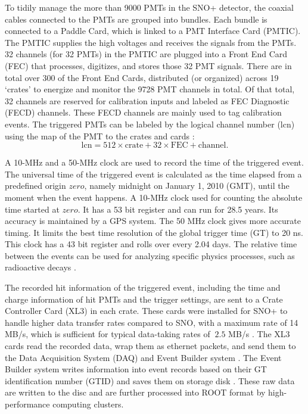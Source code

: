 To tidily manage the more than 9000 PMTs in the SNO+ detector, the coaxial cables connected to the PMTs are grouped into bundles. Each bundle is connected to a Paddle Card, which is linked to a PMT Interface Card (PMTIC). The PMTIC supplies the high voltages and receives the signals from the PMTs. 32 channels (for 32 PMTs) in the PMTIC are plugged into a Front End Card (FEC) that processes, digitizes, and stores those 32 PMT signals. There are in total over 300 of the Front End Cards, distributed (or organized) across 19 `crates' to energize and monitor the 9728 PMT channels in total. Of that total, 32 channels are reserved for calibration inputs and labeled as FEC Diagnostic (FECD) channels. These FECD channels are mainly used to tag calibration events. The triggered PMTs can be labeled by the logical channel number (lcn) using the map of the PMT to the crates and cards \cite{snop_jinst,stringer2019sensitivity}:
\begin{equation}
\mathrm{lcn = 512 \times crate + 32 \times FEC + channel}.
\end{equation}

A 10-MHz and a 50-MHz clock are used to record the time of the triggered event. The universal time of the triggered event is calculated as the time elapsed from a predefined origin $zero$, namely midnight on January 1, 2010 (GMT), until the moment when the event happens. A 10-MHz clock used for counting the absolute time started at $zero$. It has a 53 bit register and can run for 28.5 years. Its accuracy is maintained by a GPS system. The 50 MHz clock gives more accurate timing. It limits the best time resolution of the global trigger time (GT) to 20 ns. This clock has a 43 bit register and rolls over every 2.04 days. The relative time between the events can be used for analyzing specific physics processes, such as radioactive decays \cite{rattime,stringer2019sensitivity}. 

The recorded hit information of the triggered event, including the time and charge information of hit PMTs and the trigger settings, are sent to a Crate Controller Card (XL3) in each crate. These cards were installed for SNO+ to handle higher data transfer rates compared to SNO, with a maximum rate of 14 MB/s, which is sufficient for typical data-taking rates of $~2.5$ MB/s \cite{bonventre2014neutron,rumleskie2021sno+}. The XL3 cards read the recorded data, wrap them as ethernet packets, and send them to the Data Acquisition System (DAQ) and Event Builder system \cite{walker2016study}. The Event Builder system writes information into event records based on their GT identification number (GTID) and saves them on storage disk \cite{snop_jinst}. These raw data are written to the disc and are further processed into ROOT format by high-performance computing clusters.

